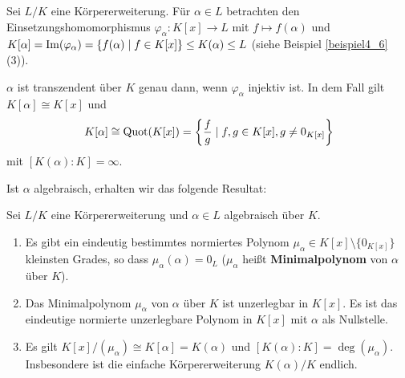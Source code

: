 \begin{rem}\label{rem7_12}
	 Sei $L/K$ eine Körpererweiterung. Für $\alpha \in L$ betrachten den Einsetzungshomomorphismus $\varphi_\alpha \colon K[x] \to L$ mit $f \mapsto f(\alpha)$ und $K[\alpha] = \mathrm{Im}(\varphi_\alpha) = \{f(\alpha) \mid f \in K[x]\} \leq K(\alpha) \leq L$ (siehe Beispiel \ref{beispiel4_6} (3)).
	 
	 $\alpha$ ist transzendent über $K$ genau dann, wenn $\varphi_\alpha$ injektiv ist. In dem Fall gilt $K[\alpha] \cong K[x]$ und 
	 \[K[\alpha] \cong \mathrm{Quot}(K[x]) = \left\{\frac{f}{g} \mid f,g \in K[x], g \neq 0_{K[x]}\right\}\]
	 mit $[K(\alpha) : K] = \infty$.	 
\end{rem}
 Ist $\alpha$ algebraisch, erhalten wir das folgende Resultat:
\begin{satz}\label{satz7_13}
	Sei $L /K$ eine Körpererweiterung und $\alpha \in L$ algebraisch über $K$.
	\begin{enumerate}[label=(\alph*)]
		\item Es gibt ein eindeutig bestimmtes normiertes Polynom $\mu_\alpha \in K[x] \setminus \{0_{K[x]}\}$ kleinsten Grades, so dass $\mu_\alpha(\alpha) = 0_L$ ($\mu_\alpha$ heißt \textbf{Minimalpolynom} von $\alpha$ über $K$).
		\item Das Minimalpolynom $\mu_\alpha$ von $\alpha$ über $K$ ist unzerlegbar in $K[x]$. Es ist das eindeutige normierte unzerlegbare Polynom in $K[x]$ mit $\alpha$ als Nullstelle.
		\item Es gilt $K[x] / (\mu_\alpha) \cong K[\alpha] = K(\alpha)$ und $[K(\alpha) : K] = \deg(\mu_\alpha)$. Insbesondere ist die einfache Körpererweiterung $K(\alpha) / K$ endlich.
	\end{enumerate}	
\end{satz}
